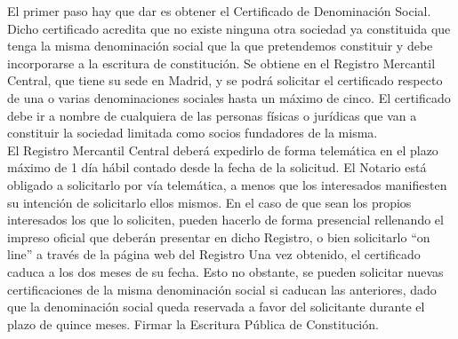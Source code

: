 El primer paso hay que dar es obtener el Certificado de Denominación Social. Dicho certificado acredita que no existe ninguna otra sociedad ya constituida que tenga la misma denominación social que la que pretendemos constituir y debe incorporarse a la escritura de constitución.
Se obtiene en el Registro Mercantil Central, que tiene su sede en Madrid, y se podrá solicitar el certificado respecto de una o varias denominaciones sociales hasta un máximo de cinco. El certificado debe ir a nombre de cualquiera de las personas físicas o jurídicas que van a constituir la sociedad limitada como socios fundadores de la misma.\\

El Registro Mercantil Central deberá expedirlo de forma telemática en el plazo máximo de 1 día hábil contado desde la fecha de la solicitud.
El Notario está obligado a solicitarlo por vía telemática, a menos que los interesados manifiesten su intención de solicitarlo ellos mismos.
En el caso de que sean los propios interesados los que lo soliciten, pueden hacerlo de forma presencial rellenando el impreso oficial que deberán presentar en dicho Registro, o bien solicitarlo “on line” a través de la página web del Registro 
Una vez obtenido, el certificado caduca a los dos meses de su fecha. Esto no obstante, se pueden solicitar nuevas certificaciones de la misma denominación social si caducan las anteriores, dado que la denominación social queda reservada a favor del solicitante durante el plazo de quince meses.
Firmar la Escritura Pública de Constitución.\\

